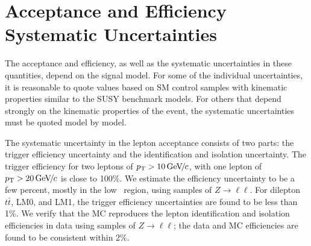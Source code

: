 \section{Acceptance and Efficiency Systematic Uncertainties}
\label{sec:systematics}


The acceptance and efficiency, as well as the systematic uncertainties in these quantities, 
depend on the signal model.
For some of the individual uncertainties, it is reasonable to quote values 
based on SM control samples with kinematic properties similar to the SUSY benchmark models. 
For others that depend strongly on the kinematic properties of the event, the systematic
uncertainties must be quoted model by model.


The systematic uncertainty in the lepton acceptance consists
of two parts: the trigger efficiency uncertainty and the 
identification and isolation uncertainty. The trigger efficiency 
for two leptons of $p_{\mathrm{T}}>10{\,\text{Ge\hspace{-.08em}V\hspace{-0.16em}/\hspace{-0.08em}}c}$, with one lepton of 
$p_{\mathrm{T}}>20{\,\text{Ge\hspace{-.08em}V\hspace{-0.16em}/\hspace{-0.08em}}c}$ is close to 100\%.
We estimate the efficiency uncertainty to be a few percent,
mostly in the low \pt\ region, using samples of $Z \to \ell\ell$. 
For dilepton $t\bar{t}$, LM0, and LM1,
the trigger efficiency uncertainties are found to be less than 1\%.
We verify that the MC reproduces the lepton identification and isolation efficiencies in data using
samples of $Z \to \ell\ell$; the data and MC efficiencies are found to be consistent within 2\%.



